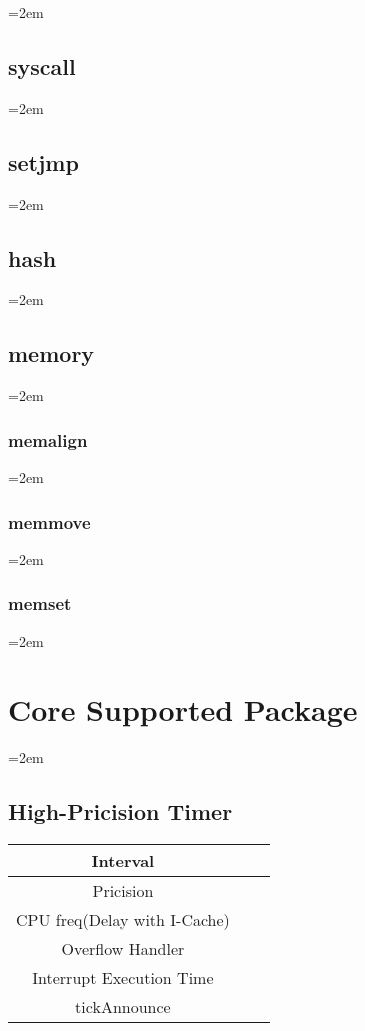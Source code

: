 \documentclass[a4paper]{article}
\let\oldsection\section
\renewcommand{\section}{\leftskip=2em \oldsection}
\let\oldsubsection\subsection
\renewcommand{\subsection}{\leftskip=2em \oldsubsection}
\let\oldsubsubsection\subsubsection
\renewcommand{\subsubsection}{\leftskip=2em \oldsubsubsection}
\begin{document}
\subsection{syscall}


\subsection{setjmp}


\subsection{hash}



\subsection{memory}


\subsubsection{memalign}


\subsubsection{memmove}


\subsubsection{memset}

\newpage
\section{Core Supported Package}

\subsection{High-Pricision Timer}
\begin{tabular}{|c|c|c|}
\hline Interval\\
\hline Pricision\\
\hline CPU freq(Delay with I-Cache)\\
\hline Overflow Handler\\
\hline Interrupt Execution Time\\
\hline tickAnnounce\\
\hline
\end{tabular}
\end{document}
